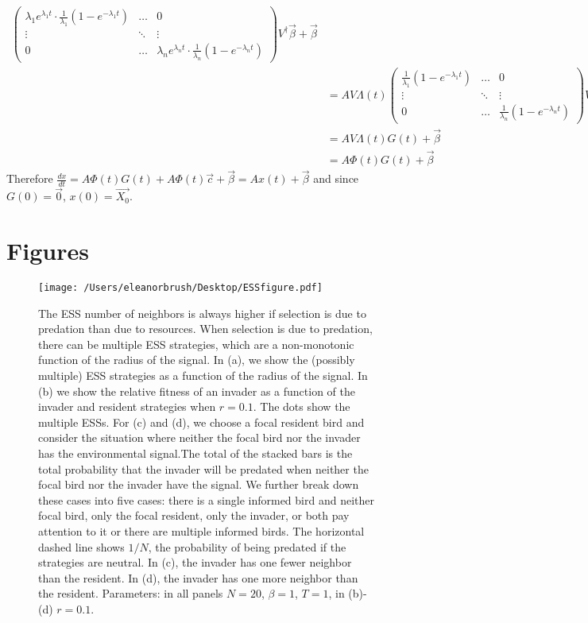 \documentclass{article}
\begin{document}
\begin{pf}
\begin{align*}
 \left(\begin{array}{ccccc}
\lambda_1e^{\lambda_1t}\cdot \frac{1}{\lambda_1}(1-e^{-\lambda_1 t})  &\dots &0
\\ \vdots & \ddots &\vdots
\\ 0 & \dots &\lambda_ne^{\lambda_nt}\cdot\frac{1}{\lambda_n}(1-e^{-\lambda_nt})
 \end{array}\right)
 V^\dagger\vec{\beta} +\vec{\beta}
  \\&=AV\Lambda(t)
 \left(\begin{array}{ccccc}
 \frac{1}{\lambda_1}(1-e^{-\lambda_1 t})  &\dots &0
\\ \vdots & \ddots &\vdots
\\ 0 & \dots &\frac{1}{\lambda_n}(1-e^{-\lambda_nt})
 \end{array}\right)
 V^\dagger\vec{\beta} +\vec{\beta}
 \\&=AV\Lambda(t)G(t)+\vec{\beta}
 \\&=A\Phi(t)G(t)+\vec{\beta}
\end{align*}
Therefore $\frac{dx}{dt}=A\Phi(t)G(t)+A\Phi(t)\vec{c}+\vec{\beta}=Ax(t)+\vec{\beta}$ and since $G(0)=\vec{0}$, $x(0)=\vec{X_0}$.
\end{pf}

\newpage
\section{Figures }
\begin{figure}
\texttt{[image: /Users/eleanorbrush/Desktop/ESSfigure.pdf]}
\caption{\label{ESS} The ESS number of neighbors is always higher if selection is due to predation than due to resources. When selection is due to predation, there can be multiple ESS strategies, which are a non-monotonic function of the radius of the signal. In (a), we show the (possibly multiple) ESS strategies as a function of the radius of the signal. In (b) we show the relative fitness of an invader as a function of the invader and resident strategies when $r=0.1$. The dots show the multiple ESSs. For (c) and (d), we choose a focal resident bird and consider the situation where neither the focal bird nor the invader has the environmental signal.The total of the stacked bars is the total probability that the invader will be predated when neither the focal bird nor the invader have the signal.  We further break down these cases into five cases: there is a single informed bird and neither focal bird, only the focal resident, only the invader, or both pay attention to it or there are multiple informed birds. The horizontal dashed line shows $1/N$, the probability of being predated if the strategies are neutral. In (c), the invader has one fewer neighbor than the resident. In (d), the invader has one more neighbor than the resident. Parameters:  in all panels $N=20$, $\beta=1$, $T=1$, in (b)-(d) $r=0.1$. 
}
\end{figure}
\end{document}
